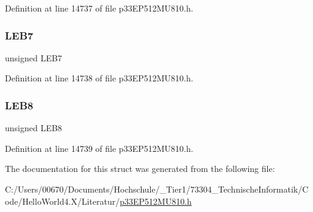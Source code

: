 Definition at line 14737 of file p33\+E\+P512\+M\+U810.\+h.

\mbox{\label{structtag_l_e_b_d_l_y3_b_i_t_s_aa76d586b04119d8459718019ddd964ef}} 
\subsubsection{\texorpdfstring{L\+E\+B7}{LEB7}}
{\footnotesize\ttfamily unsigned L\+E\+B7}



Definition at line 14738 of file p33\+E\+P512\+M\+U810.\+h.

\mbox{\label{structtag_l_e_b_d_l_y3_b_i_t_s_a9b22b47001301c6ae00c3eea0f385091}} 
\subsubsection{\texorpdfstring{L\+E\+B8}{LEB8}}
{\footnotesize\ttfamily unsigned L\+E\+B8}



Definition at line 14739 of file p33\+E\+P512\+M\+U810.\+h.



The documentation for this struct was generated from the following file\+:\begin{DoxyCompactItemize}
\item 
C\+:/\+Users/00670/\+Documents/\+Hochschule/\+\_\+\+Tier1/73304\+\_\+\+Technische\+Informatik/\+Code/\+Hello\+World4.\+X/\+Literatur/\hyperlink{p33_e_p512_m_u810_8h}{p33\+E\+P512\+M\+U810.\+h}\end{DoxyCompactItemize}
